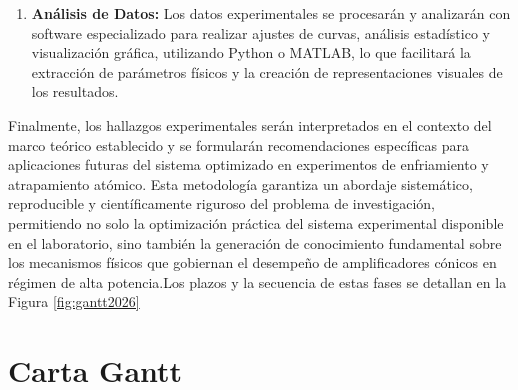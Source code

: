 \documentclass[12pt]{article}
\begin{document}
\begin{enumerate}
\begin{enumerate}[$\bullet$]
    \item Se llevará a cabo una caracterización espectral de alta resolución mediante espectroscopía heterodina para verificar la preservación del ancho de línea del ECDL tras la amplificación y detectar posibles contribuciones de emisión espontánea amplificada.
  \end{enumerate}
  \item \textbf{Análisis de Datos:} Los datos experimentales se procesarán y analizarán con software especializado para realizar ajustes de curvas, análisis estadístico y visualización gráfica, utilizando Python o MATLAB, lo que facilitará la extracción de parámetros físicos y la creación de representaciones visuales de los resultados.
\end{enumerate}

Finalmente, los hallazgos experimentales serán interpretados en el contexto del marco teórico establecido y se formularán recomendaciones específicas para aplicaciones futuras del sistema optimizado en experimentos de enfriamiento y atrapamiento atómico. Esta metodología garantiza un abordaje sistemático, reproducible y científicamente riguroso del problema de investigación, permitiendo no solo la optimización práctica del sistema experimental disponible en el laboratorio, sino también la generación de conocimiento fundamental sobre los mecanismos físicos que gobiernan el desempeño de amplificadores cónicos en régimen de alta potencia.Los plazos y la secuencia de estas fases se detallan en la Figura \ref{fig:gantt2026}


\section{Carta Gantt}
\end{document}
